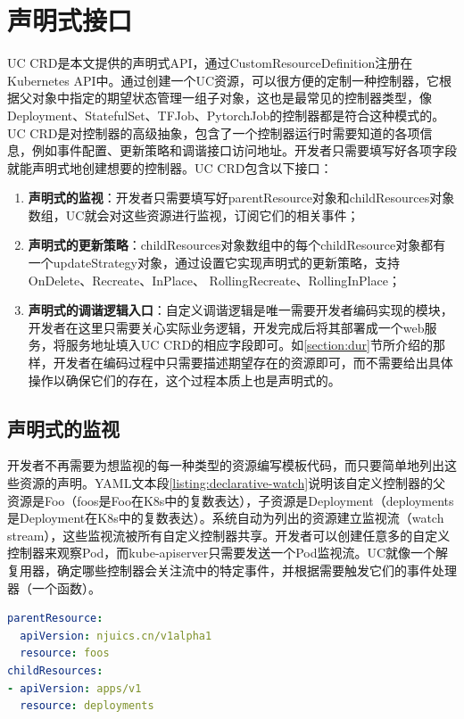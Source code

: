\documentclass[macfonts,master]{njuthesis}
\begin{document}
\section{声明式接口}

UC CRD是本文提供的声明式API，通过CustomResourceDefinition注册在Kubernetes API中。通过创建一个UC资源，可以很方便的定制一种控制器，它根据父对象中指定的期望状态管理一组子对象，这也是最常见的控制器类型，像Deployment、StatefulSet、TFJob、PytorchJob的控制器都是符合这种模式的。UC CRD是对控制器的高级抽象，包含了一个控制器运行时需要知道的各项信息，例如事件配置、更新策略和调谐接口访问地址。开发者只需要填写好各项字段就能声明式地创建想要的控制器。UC CRD包含以下接口：

\begin{enumerate}
	\item \textbf{声明式的监视}：开发者只需要填写好parentResource对象和childResources对象数组，UC就会对这些资源进行监视，订阅它们的相关事件；
	\item \textbf{声明式的更新策略}：childResources对象数组中的每个childResource对象都有一个updateStrategy对象，通过设置它实现声明式的更新策略，支持OnDelete、Recreate、InPlace、 RollingRecreate、RollingInPlace；
	\item \textbf{声明式的调谐逻辑入口}：自定义调谐逻辑是唯一需要开发者编码实现的模块，开发者在这里只需要关心实际业务逻辑，开发完成后将其部署成一个web服务，将服务地址填入UC CRD的相应字段即可。如\ref{section:dur}节所介绍的那样，开发者在编码过程中只需要描述期望存在的资源即可，而不需要给出具体操作以确保它们的存在，这个过程本质上也是声明式的。
\end{enumerate}

\subsection{声明式的监视}

开发者不再需要为想监视的每一种类型的资源编写模板代码，而只要简单地列出这些资源的声明。YAML文本段\ref{listing:declarative-watch}说明该自定义控制器的父资源是Foo（foos是Foo在K8s中的复数表达），子资源是Deployment（deployments是Deployment在K8s中的复数表达）。系统自动为列出的资源建立监视流（watch stream），这些监视流被所有自定义控制器共享。开发者可以创建任意多的自定义控制器来观察Pod，而kube-apiserver只需要发送一个Pod监视流。UC就像一个解复用器，确定哪些控制器会关注流中的特定事件，并根据需要触发它们的事件处理器（一个函数）。
\begin{lstlisting}[language=yaml,caption=声明式的监视,label=listing:declarative-watch]
parentResource:
  apiVersion: njuics.cn/v1alpha1
  resource: foos
childResources:
- apiVersion: apps/v1
  resource: deployments
\end{lstlisting}
\end{document}
